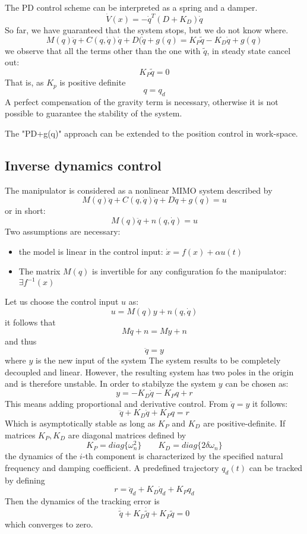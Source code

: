 \documentclass{book}
\begin{document}
The PD control scheme can be interpreted as a spring and a damper.
\[
    \dot{V}(x)=-\dot{q}^T(D+K_D)\dot{q}
\]
So far, we have guaranteed that the system stops, but we do not know where.
\[
    M(q)\ddot{q}+C(q,\dot{q})\dot{q}+D(\dot{q}+g(q) = K_P\tilde{q}-K_D\dot{q}+g(q) 
\]
we observe that all the terms other than the one with $\tilde{q}$, in steady state cancel out:
\[
    K_P\tilde{q} = 0
\]
That is, as $K_p$ is positive definite
\[
    q=q_d
\]
A perfect compensation of the gravity term is necessary, otherwise it is not possible to guarantee the stability of the system.

The "PD+g(q)" approach can be extended to the position control in work-space.





\subsection{Inverse dynamics control}
The manipulator is considered as a nonlinear MIMO system described by 
\[
    M(q)\ddot{q}+C(q,\dot{q})\dot{q}+D\dot{q}+g(q)=u
\]
or in short:
\[
    M(q)\ddot{q}+n(q,\dot{q})=u
\]
Two assumptions are necessary:
\begin{itemize}
    \item the model is linear in the control input: $ \dot{x}=f(x)+\alpha u(t)$
    \item The matrix $M(q)$ is invertible for any configuration fo the manipulator: $ \exists f^{-1}(x)$
\end{itemize}
Let us choose the control input $u$ as:
\[
    u=M(q)y + n(q,\dot{q})
\]
it follows that
\[
    M\ddot{q}+n=My+n
\]
and thus
\[
    \ddot{q}=y
\]
where $y$ is the new input of the system
The system results to be completely decoupled and linear. However, the resulting system has two poles in the origin and is therefore unstable. In order to stabilyze the system $y$ can be chosen as:
\[
    y= -K_D\dot{q}-K_Pq+r
\]
This means adding proportional and derivative control. From $\ddot{q}=y$ it follows:
\[
    \ddot{q}+K_D\dot{q}+K_Pq=r
\]
Which is asymptotically stable as long as $K_P$ and $K_D$ are positive-definite. If matrices $K_P,K_D$ are diagonal matrices defined by
\[
    K_P=diag\{\omega_n^2\} \qquad K_D=diag\{2\delta \omega_n\}
\]
the dynamics of the $i$-th component is characterized by the specified natural frequency and damping coefficient. A predefined trajectory $q_d(t)$ can be tracked by defining
\[
    r = \ddot{q}_d+K_D\dot{q}_d+K_Pq_d
\]
Then the dynamics of the tracking error is
\[
    \ddot{\tilde{q}} + K_D\dot{\tilde{q}} + K_P\tilde{q} = 0
\]
which converges to zero.
\end{document}
